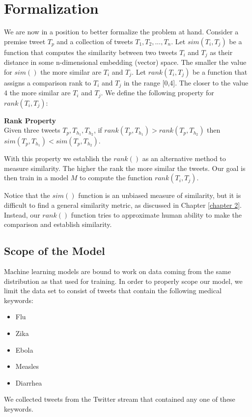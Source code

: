 \documentclass[12pt]{report}
\begin{document}
\section{Formalization}\label{formalization_problem}
We are now in a position to better formalize the problem at hand. Consider a premise tweet $T_p$ and a collection of tweets 
$T_1, T_2,..., T_n$. Let $sim(T_i, T_j)$ be a function that computes the similarity between  two tweets $T_i$ and $T_j$ as their distance 
in some n-dimensional embedding (vector) space. The smaller the value for $sim()$ the more similar are $T_i$ and $T_j$.   Let $rank(T_i, T_j)$ be a function that assigns a comparison rank to $T_i$ and $T_j$ in the range [0,4]. The closer to the value 4 the more similar are $T_i$ and $T_j$.
We define the following property for $rank(T_i, T_j)$:
\begin{property}{\bf Rank Property}\\ 
	Given three tweets $T_p, T_{h_1}, T_{h_2}$, if $rank(T_p, T_{h_1}) > rank(T_p, T_{h_2})$ then $sim(T_p, T_{h_1}) < sim(T_p, T_{h_2})$.
\end{property}
With this property we establish the $rank()$ as an alternative method to measure similarity. The higher the rank  the more similar the tweets. 
Our goal is then train in a model $M$ to compute the function $rank(T_i, T_j)$.

Notice that the $sim()$ function is an unbiased measure of similarity, but it is difficult to find a general similarity metric, as discussed in 
Chapter \ref{chapter 2}. Instead, our $rank()$ function
tries to approximate human ability to make the comparison and establish similarity. 


\subsection{Scope of the Model}
Machine learning models are bound to work on data coming from the same distribution as that used for training. In order to properly scope
our model, we limit the data set to consist of tweets that contain the following medical keywords:
\begin{itemize}[nolistsep]
	\item Flu
	\item Zika
	\item Ebola
	\item Measles
	\item Diarrhea  
\end{itemize}
We collected tweets from the Twitter stream that contained any one of these keywords.
\end{document}
